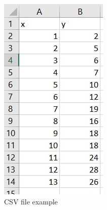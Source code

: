 \begin{figure}[H]
\centering
\includegraphics[scale=0.75]{img/json/csvfile.jpg}
\caption{CSV file example}
\end{figure}
